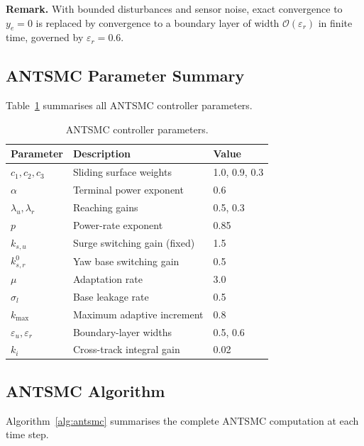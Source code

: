 \documentclass[review]{cas-dc}
\begin{document}
\textbf{Remark.} With bounded disturbances and sensor noise, exact convergence to $y_e = 0$ is replaced by convergence to a boundary layer of width $\mathcal{O}(\varepsilon_r)$ in finite time, governed by $\varepsilon_r = 0.6$.


\subsection{ANTSMC Parameter Summary}
\label{sec:antsmc_params}

Table~\ref{tab:antsmc_params} summarises all ANTSMC controller parameters.

\begin{table}[t]
\centering
\caption{ANTSMC controller parameters.}
\label{tab:antsmc_params}
\begin{tabular}{lll}
\toprule
Parameter & Description & Value \\
\midrule
$c_1, c_2, c_3$ & Sliding surface weights & 1.0, 0.9, 0.3 \\
$\alpha$ & Terminal power exponent & 0.6 \\
$\lambda_u, \lambda_r$ & Reaching gains & 0.5, 0.3 \\
$p$ & Power-rate exponent & 0.85 \\
$k_{s,u}$ & Surge switching gain (fixed) & 1.5 \\
$k_{s,r}^0$ & Yaw base switching gain & 0.5 \\
$\mu$ & Adaptation rate & 3.0 \\
$\sigma_l$ & Base leakage rate & 0.5 \\
$k_{\max}$ & Maximum adaptive increment & 0.8 \\
$\varepsilon_u, \varepsilon_r$ & Boundary-layer widths & 0.5, 0.6 \\
$k_i$ & Cross-track integral gain & 0.02 \\
\bottomrule
\end{tabular}
\end{table}


\subsection{ANTSMC Algorithm}
\label{sec:algorithm}

Algorithm~\ref{alg:antsmc} summarises the complete ANTSMC computation at each time step.
\end{document}
